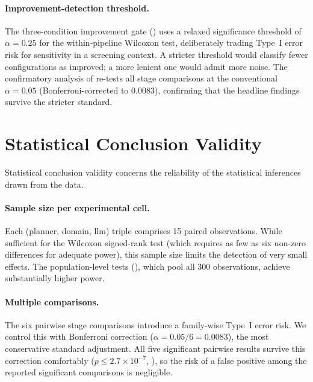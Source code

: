 \paragraph{Improvement-detection threshold.}
The three-condition improvement gate () uses a relaxed significance threshold of $\alpha = 0.25$ for the within-pipeline Wilcoxon test, deliberately trading Type~I error risk for sensitivity in a screening context.
A stricter threshold would classify fewer configurations as improved; a more lenient one would admit more noise.
The confirmatory analysis of  re-tests all stage comparisons at the conventional $\alpha = 0.05$ (Bonferroni-corrected to $0.0083$), confirming that the headline findings survive the stricter standard.

\section{Statistical Conclusion Validity}
\label{sec:threats:statistical}

Statistical conclusion validity concerns the reliability of the statistical inferences drawn from the data.

\paragraph{Sample size per experimental cell.}
Each (planner, domain, \gls{llm}) triple comprises 15 paired observations.
While sufficient for the Wilcoxon signed-rank test (which requires as few as six non-zero differences for adequate power), this sample size limits the detection of very small effects.
The population-level tests (), which pool all 300 observations, achieve substantially higher power.

\paragraph{Multiple comparisons.}
The six pairwise stage comparisons introduce a family-wise Type~I error risk.
We control this with Bonferroni correction ($\alpha = 0.05 / 6 = 0.0083$), the most conservative standard adjustment.
All five significant pairwise results survive this correction comfortably ($p \leq 2.7 \times 10^{-7}$, ), so the risk of a false positive among the reported significant comparisons is negligible.

